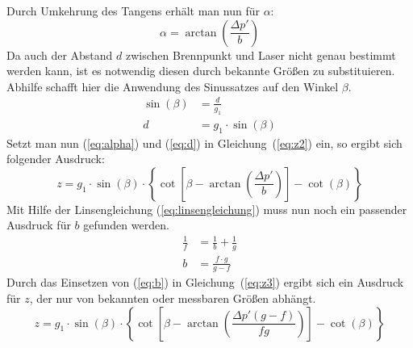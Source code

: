Durch Umkehrung des Tangens erhält man nun für $\alpha$:
\begin{equation}
	\alpha = \arctan\left(\frac{\Delta p'}{b}\right)
	\label{eq:alpha}
\end{equation}
Da auch der Abstand $d$ zwischen Brennpunkt und Laser nicht genau bestimmt werden kann, ist es notwendig diesen durch bekannte Größen zu substituieren. Abhilfe schafft hier die Anwendung des Sinussatzes auf den Winkel $\beta$.
\begin{align}
	\sin(\beta) &= \frac{d}{g_1}\\
	d &= g_1\cdot\sin(\beta)
	\label{eq:d}
\end{align}
Setzt man nun (\ref{eq:alpha}) und (\ref{eq:d}) in Gleichung~(\ref{eq:z2}) ein, so ergibt sich folgender Ausdruck:
\begin{equation}
	z = g_1\cdot\sin(\beta)\cdot\left\{\cot\left[\beta-\arctan\left(\frac{\Delta p'}{b}\right)\right]-\cot(\beta)\right\}
	\label{eq:z3}
\end{equation}
Mit Hilfe der Linsengleichung (\ref{eq:linsengleichung}) muss nun noch ein passender Ausdruck für $b$ gefunden werden.
\begin{align}
	\frac{1}{f} &= \frac{1}{b} + \frac{1}{g} \label{eq:linsengleichung}\\
	b &= \frac{f\cdot g}{g-f} \label{eq:b}
\end{align}
Durch das Einsetzen von (\ref{eq:b}) in Gleichung~(\ref{eq:z3}) ergibt sich ein Ausdruck für $z$, der nur von bekannten oder messbaren Größen abhängt. 
\begin{equation}
	z = g_1\cdot\sin(\beta)\cdot\left\{\cot\left[\beta-\arctan\left(\frac{\Delta p'(g-f)}{fg}\right)\right]-\cot(\beta)\right\}
	\label{eq:zfinal}
\end{equation}

